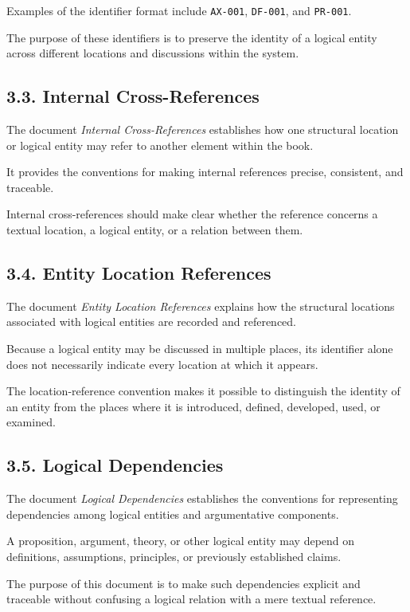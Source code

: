 Examples of the identifier format include
\texttt{AX-001}, \texttt{DF-001}, and
\texttt{PR-001}.

The purpose of these identifiers is to preserve
the identity of a logical entity across different
locations and discussions within the system.

\subsection*{3.3. Internal Cross-References}

The document \textit{Internal Cross-References}
establishes how one structural location or logical
entity may refer to another element within the
book.

It provides the conventions for making internal
references precise, consistent, and traceable.

Internal cross-references should make clear whether
the reference concerns a textual location, a logical
entity, or a relation between them.

\subsection*{3.4. Entity Location References}

The document \textit{Entity Location References}
explains how the structural locations associated
with logical entities are recorded and referenced.

Because a logical entity may be discussed in
multiple places, its identifier alone does not
necessarily indicate every location at which it
appears.

The location-reference convention makes it
possible to distinguish the identity of an entity
from the places where it is introduced, defined,
developed, used, or examined.

\subsection*{3.5. Logical Dependencies}

The document \textit{Logical Dependencies}
establishes the conventions for representing
dependencies among logical entities and
argumentative components.

A proposition, argument, theory, or other
logical entity may depend on definitions,
assumptions, principles, or previously established
claims.

The purpose of this document is to make such
dependencies explicit and traceable without
confusing a logical relation with a mere textual
reference.

